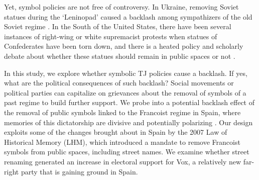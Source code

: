 \documentclass[12pt, titlepage]{article}
\begin{document}
Yet, symbol policies are not free of controversy. In Ukraine, removing Soviet statues during the `Leninopad' caused a backlash among sympathizers of the old Soviet regime \citep{Rozenas:2021}. In the South of the United States, there have been several instances of right-wing or white supremacist protests when statues of Confederates have been torn down, and there is a heated policy and scholarly debate about whether these statues should remain in public spaces or not \citep{Grossman:2016}.


In this study, we explore whether symbolic TJ policies cause a backlash. If yes, what are the political consequences of such backlash? Social movements or political parties can capitalize on grievances about the removal of symbols of a past regime to build further support. We probe into a potential backlash effect of the removal of public symbols linked to the Francoist regime in Spain, where memories of this dictatorship are divisive and potentially polarizing \citep{Balcells:2012aa}.
Our design exploits some of the changes brought about in Spain by the 2007 Law of Historical Memory (LHM), which introduced a mandate to remove Francoist symbols from public spaces, including street names. We examine whether street renaming generated an increase in electoral support for Vox, a relatively new far-right party that is gaining ground in Spain.
\end{document}
